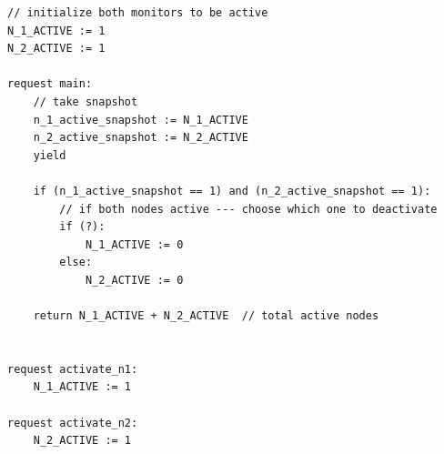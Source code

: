 \begin{minipage}[htbp]{1.1\textwidth}
	\begin{lstlisting}[caption={Snapshot-based monitor deactivation (not serializable)},numbers=none]
// initialize both monitors to be active
N_1_ACTIVE := 1
N_2_ACTIVE := 1

request main:
    // take snapshot
    n_1_active_snapshot := N_1_ACTIVE
    n_2_active_snapshot := N_2_ACTIVE
    yield

    if (n_1_active_snapshot == 1) and (n_2_active_snapshot == 1):
        // if both nodes active --- choose which one to deactivate 
        if (?): 
            N_1_ACTIVE := 0
        else:
            N_2_ACTIVE := 0

    return N_1_ACTIVE + N_2_ACTIVE  // total active nodes


request activate_n1:
    N_1_ACTIVE := 1

request activate_n2:
    N_2_ACTIVE := 1
		
		
	\end{lstlisting}
\end{minipage}








